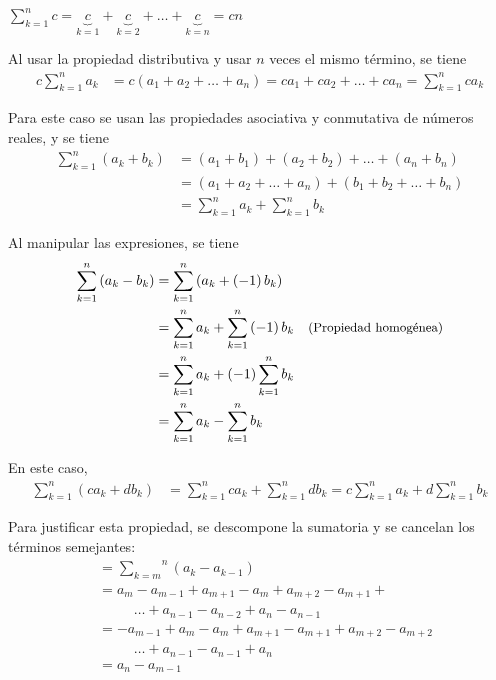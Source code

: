 \begin{parrafonumerado}

\item $\sum_{k=1}^{n}c=\underset{k=1}{\underbrace{c}}+%
  \underset{k=2}{\underbrace{c}}+\ldots +\underset{k=n}{\underbrace{c}}=cn$

\item Al usar la propiedad distributiva y usar $n$ veces el mismo término, se tiene
  \begin{align*}
    c\sum_{k=1}^{n}a_{k}&=c\left( a_{1}+a_{2}+\ldots
    +a_{n}\right)%
    =ca_{1}+ca_{2}+\ldots +ca_{n}=\sum_{k=1}^{n}ca_{k}
  \end{align*}

\item Para este caso se usan las propiedades asociativa y conmutativa de números reales, y se tiene
  \begin{align*}
    \sum_{k=1}^{n}\left( a_{k}+b_{k}\right)
    &=\left(a_{1}+b_{1}\right) +\left( a_{2}+b_{2}\right) +\ldots +\left(
    a_{n}+b_{n}\right) \\
    &=\left( a_{1}+a_{2}+\ldots +a_{n}\right) +\left(
    b_{1}+b_{2}+\ldots +b_{n}\right)\\
    &=\sum_{k=1}^{n}a_{k}+\sum_{k=1}^{n}b_{k}
  \end{align*}

\item Al manipular las expresiones, se tiene
  \begin{align*}
    \sum_{k=1}^{n}\left( a_{k}-b_{k}\right) &=\overset{n}{ \underset{k=1}{\sum }}\left( a_{k}+\left( -1\right) b_{k}\right)\\
    &=\sum_{k=1}^{n}a_{k}+\sum_{k=1}^{n}\left( -1\right) b_{k} \quad \text{\small (Propiedad homogénea)}\\
    &=\sum_{k=1}^{n}a_{k}+\left(-1\right) \sum_{k=1}^{n}b_{k}\\
    &=\sum_{k=1}^{n}a_{k}-\sum_{k=1}^{n}b_{k}
  \end{align*}

\item En este caso,
  \begin{align*}
    \sum_{k=1}^{n}\left( ca_{k}+db_{k}\right) &=\sum_{k=1}^{n}ca_{k}+\sum_{k=1}^{n}db_{k}=c\sum_{k=1}^{n}a_{k}+d\sum_{k=1}^{n}b_{k}
  \end{align*}

\item Para justificar esta propiedad, se descompone la sumatoria y se cancelan los términos semejantes:
  \begin{align*}
    &=\overset{n}{\underset{k=m}{\sum }}\left( a_{k}-a_{k-1}\right)\\
    &= a_{m}-a_{m-1}+ a_{m+1}-a_{m}+ a_{m+2}-a_{m+1} +\\
    &\phantom{= a_{m}} \ldots + a_{n-1}-a_{n-2} + a_{n}-a_{n-1}\\
    &=-a_{m-1}+ a_{m}-a_{m} + a_{m+1}-a_{m+1}+ a_{m+2}-a_{m+2} \\
    &\phantom{= a_{m}} \ldots + a_{n-1}-a_{n-1} +a_{n}\\
    &=a_{n}-a_{m-1}
  \end{align*}
\end{parrafonumerado}

